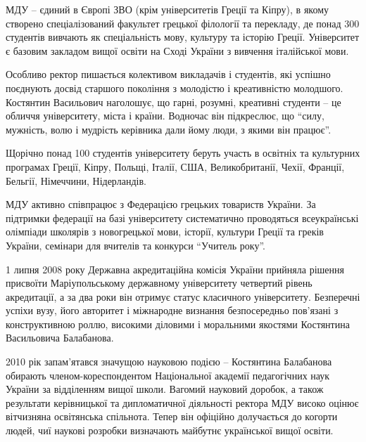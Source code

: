 
МДУ – єдиний в Європі ЗВО (крім університетів Греції та Кіпру), в якому
створено спеціалізований факультет грецької філології та перекладу, де понад
300 студентів вивчають як спеціальність мову, культуру та історію Греції.
Університет є базовим закладом вищої освіти на Сході України з вивчення
італійської мови.

Особливо ректор пишається колективом викладачів і студентів, які успішно
поєднують досвід старшого покоління з молодістю і креативністю молодшого.
Костянтин Васильович наголошує, що гарні, розумні, креативні студенти – це
обличчя університету, міста і країни. Водночас він підкреслює, що
\enquote{силу, мужність, волю і мудрість керівника дали йому люди, з якими він
працює}.


Щорічно понад 100 студентів університету беруть участь в освітніх та культурних
програмах Греції, Кіпру, Польщі, Італії, США, Великобританії, Чехії, Франції,
Бельгії, Німеччини, Нідерландів.

МДУ активно співпрацює з Федерацією грецьких товариств України. За підтримки
федерації на базі університету систематично проводяться всеукраїнські олімпіади
школярів з новогрецької мови, історії, культури Греції та греків України,
семінари для вчителів та конкурси \enquote{Учитель року}.


1 липня 2008 року Державна акредитаційна комісія України прийняла рішення
присвоїти Маріупольському державному університету четвертий рівень акредитації,
а за два роки він отримує статус класичного університету. Безперечні успіхи
вузу, його авторитет і міжнародне визнання безпосередньо пов'язані з
конструктивною роллю, високими діловими і моральними якостями Костянтина
Васильовича Балабанова.


2010 рік запам'ятався значущою науковою подією – Костянтина Балабанова обирають
членом-кореспондентом Національної академії педагогічних наук України за
відділенням вищої школи. Вагомий науковий доробок, а також результати
керівницької та дипломатичної діяльності ректора МДУ високо оцінює вітчизняна
освітянська спільнота. Тепер він офіційно долучається до когорти людей, чиї
наукові розробки визначають майбутнє української вищої освіти.

